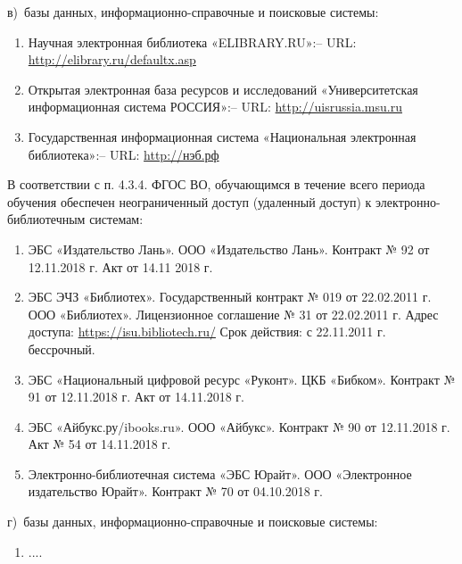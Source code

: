 \documentclass[12pt]{scrartcl}
\newcommand{\rdf}[2]{#2}
\newenvironment{rdfctx}[1]{}{}
\begin{document}
\noindent в)\ базы данных, информационно-справочные и поисковые системы:
\begin{rdfctx}{\rdfsetctx{list}{syll wpdd:itemList !wpdd:EReferenceList !wpdd:ItemList}}
\begin{enumerate}
  \item \rdf{list ^schema:member !wpdd:ListItem !wpdd:EReference}{Научная электронная библиотека «ELIBRARY.RU»\;:\;[сайт] -- URL: \url{http://elibrary.ru/defaultx.asp}}
  \item \rdf{list ^schema:member !wpdd:ListItem !wpdd:EReference}{Открытая электронная база ресурсов и исследований «Университетская информационная система РОССИЯ»\;:\;[сайт] -- URL: \url{http://uisrussia.msu.ru}}
  \item \rdf{list ^schema:member !wpdd:ListItem !wpdd:EReference}{Государственная информационная система «Национальная электронная библиотека»\;:\;[сайт] -- URL: \url{http://нэб.рф}}
\end{enumerate}
\end{rdfctx}
  В соответствии с п. 4.3.4. ФГОС ВО, обучающимся в течение всего периода обучения обеспечен неограниченный доступ (удаленный доступ) к электронно-библиотечным системам:
\begin{rdfctx}{\rdfsetctx{list}{syll wpdd:itemList !wpdd:EContractList !wpdd:ItemList}}
  \begin{enumerate}
  \item \rdf{list ^schema:member !wpdd:ListItem !wpdd:EReference}{ЭБС «Издательство Лань». ООО «Издательство Лань». Контракт № 92 от 12.11.2018 г. Акт от 14.11 2018 г.}
  \item \rdf{list ^schema:member !wpdd:ListItem !wpdd:EReference}{ЭБС ЭЧЗ «Библиотех». Государственный контракт № 019 от 22.02.2011 г. ООО «Библиотех». Лицензионное соглашение № 31 от 22.02.2011 г. Адрес доступа: \url{https://isu.bibliotech.ru/} Срок действия: с 22.11.2011 г. бессрочный.}
  \item \rdf{list ^schema:member !wpdd:ListItem !wpdd:EReference}{ЭБС «Национальный цифровой ресурс «Руконт». ЦКБ «Бибком». Контракт № 91 от 12.11.2018 г. Акт от 14.11.2018 г.}
  \item \rdf{list ^schema:member !wpdd:ListItem !wpdd:EReference}{ЭБС «Айбукс.ру/ibooks.ru». ООО «Айбукс». Контракт № 90 от 12.11.2018 г. Акт № 54 от 14.11.2018 г.}
  \item \rdf{list ^schema:member !wpdd:ListItem !wpdd:EReference rdfs:label}{Электронно-библиотечная система «ЭБС Юрайт». ООО «Электронное издательство Юрайт». Контракт № 70 от 04.10.2018 г.}
  \end{enumerate}
\end{rdfctx}
\noindent г)\ базы данных, информационно-справочные и поисковые системы:
\begin{rdfctx}{\rdfsetctx{list}{syll wpdd:itemList !wpdd:InternetResources !wpdd:ItemList}}
  \begin{enumerate}
  \item \rdf{list ^schema:member !wpdd:ListItem !wpdd:InternetResource}{....}
  \end{enumerate}
\end{rdfctx}
\end{document}
